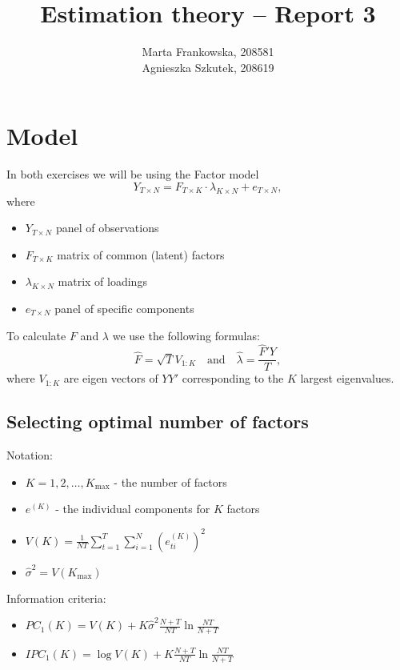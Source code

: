 \documentclass[12pt, a4paper]{article}\usepackage[]{graphicx}\usepackage[]{color}
\begin{document}
\title{Estimation theory -- Report 3}
\author{Marta Frankowska, 208581 \\ Agnieszka Szkutek, 208619}
\maketitle
\tableofcontents 


\section{Model}
In both exercises we will be using the Factor model
\[ Y_{T\times N} = F_{T\times K} \cdot \lambda_{K\times N} + e_{T\times N},\]
where 
\begin{itemize}
  \item $Y_{T\times N}$ panel of observations
  \item $F_{T\times K}$ matrix of common (latent) factors
  \item $\lambda_{K\times N}$ matrix of loadings
  \item $e_{T\times N}$ panel of specific components
\end{itemize}

To calculate $F$ and $\lambda$ we use the following formulas:
\[ \hat{F} = \sqrt{T} V_{1:K} \quad\text{and}\quad \hat{\lambda} = \frac{\hat{F}' Y}{T},\]
where $V_{1:K}$ are eigen vectors of $YY'$ corresponding to the $K$ largest eigenvalues.


\subsection{Selecting optimal number of factors}
Notation:
\begin{itemize}
  \item $K = 1,2,\dots,K_\text{max}$ - the number of factors
  \item $e^{(K)}$ - the individual components for $K$ factors
  \item $V(K) = \frac{1}{NT}\sum_{t=1}^{T} \sum_{i=1}^{N} \left( e^{(K)}_{t i} \right)^2$
  \item $\hat{\sigma}^2 = V(K_\text{max})$
\end{itemize}

Information criteria:
\begin{itemize}
  \item $PC_1(K) = V(K) + K \hat{\sigma}^2 \frac{N+T}{NT} \ln{\frac{NT}{N+T}}$
  \item $IPC_1(K) = \log{V(K)} + K\frac{N+T}{NT} \ln{\frac{NT}{N+T}}$
\end{itemize}
\end{document}
